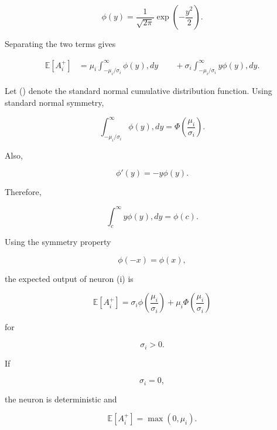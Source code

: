 \documentclass[12pt,a4paper]{report}
\begin{document}
\begin{equation}
\phi(y)
=
\frac{1}{\sqrt{2\pi}}
\exp
\left(
-\frac{y^2}{2}
\right).
\end{equation}

Separating the two terms gives

\begin{align}
\mathbb{E}[A_i^+]
&=
\mu_i
\int_{-\mu_i/\sigma_i}^{\infty}
\phi(y),dy
\
&\quad+
\sigma_i
\int_{-\mu_i/\sigma_i}^{\infty}
y\phi(y),dy.
\end{align}

Let (\Phi) denote the standard normal cumulative distribution function. Using standard normal symmetry,

\begin{equation}
\int_{-\mu_i/\sigma_i}^{\infty}
\phi(y),dy
=
\Phi
\left(
\frac{\mu_i}{\sigma_i}
\right).
\end{equation}

Also,

\begin{equation}
\phi'(y)
=
-y\phi(y).
\end{equation}

Therefore,

\begin{equation}
\int_c^\infty
y\phi(y),dy
=
\phi(c).
\end{equation}

Using the symmetry property

\begin{equation}
\phi(-x)
=
\phi(x),
\end{equation}

the expected output of neuron (i) is

\begin{equation}
\boxed{
\mathbb{E}[A_i^+]
=
\sigma_i
\phi
\left(
\frac{\mu_i}{\sigma_i}
\right)
+
\mu_i
\Phi
\left(
\frac{\mu_i}{\sigma_i}
\right)
}
\end{equation}

for

\begin{equation}
\sigma_i>0.
\end{equation}

If

\begin{equation}
\sigma_i=0,
\end{equation}

the neuron is deterministic and

\begin{equation}
\mathbb{E}[A_i^+]
=
\max(0,\mu_i).
\end{equation}
\end{document}

